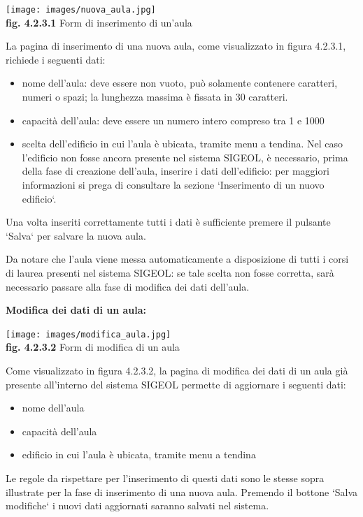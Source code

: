 \documentclass[11pt,a4paper]{article}
\begin{document}
\begin{center}
	\texttt{[image: images/nuova\_aula.jpg]}\\
	\textbf{fig. 4.2.3.1} Form di inserimento di un'aula\\
\end{center}

La pagina di inserimento di una nuova aula, come visualizzato in figura 4.2.3.1, richiede i seguenti dati:
\begin{itemize}
 \item nome dell'aula: deve essere non vuoto, può solamente contenere caratteri, numeri o spazi; la lunghezza massima è fissata in 30 caratteri. 
 \item capacità dell'aula: deve essere un numero intero compreso tra 1 e 1000
 \item scelta dell'edificio in cui l'aula è ubicata, tramite menu a tendina. Nel caso l'edificio non fosse ancora presente nel sistema SIGEOL, è necessario, prima della fase di creazione dell'aula, inserire i dati dell'edificio: per maggiori informazioni si prega di consultare la sezione `Inserimento di un nuovo edificio`.
\end{itemize}
Una volta inseriti correttamente tutti i dati è sufficiente premere il pulsante `Salva` per salvare la nuova aula.

Da notare che l'aula viene messa automaticamente a disposizione di tutti i corsi di laurea presenti nel sistema SIGEOL: se tale scelta non fosse corretta, sarà necessario passare alla fase di modifica dei dati dell'aula.
\newpage
\begin{large}\textbf{Modifica dei dati di un aula:}\end{large}

\begin{center}
	\texttt{[image: images/modifica\_aula.jpg]}\\
	\textbf{fig. 4.2.3.2} Form di modifica di un aula\\
\end{center}

Come visualizzato in figura 4.2.3.2, la pagina di modifica dei dati di un aula già presente all'interno del sistema SIGEOL permette di aggiornare i seguenti dati:
\begin{itemize}
 \item nome dell'aula
 \item capacità dell'aula
 \item edificio in cui l'aula è ubicata, tramite menu a tendina
\end{itemize}
Le regole da rispettare per l'inserimento di questi dati sono le stesse sopra illustrate per la fase di inserimento di una nuova aula.
Premendo il bottone `Salva modifiche` i nuovi dati aggiornati saranno salvati nel sistema.
\end{document}
